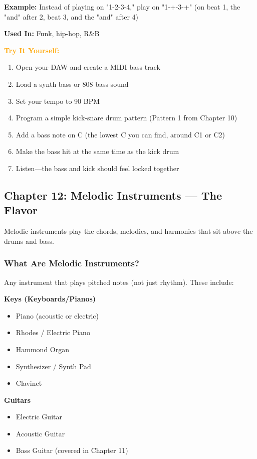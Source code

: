 \documentclass[11pt,letterpaper]{article}
\newcommand{\orangetext}[1]{\textcolor{orange}{\textbf{#1}}}
\begin{document}
\textbf{Example:} Instead of playing on "1-2-3-4," play on "1-+-3-+" (on beat 1, the "and" after 2, beat 3, and the "and" after 4)

\textbf{Used In:} Funk, hip-hop, R\&B

\textbf{\orangetext{Try It Yourself:}}

\begin{enumerate}[leftmargin=*]
\item Open your DAW and create a MIDI bass track
\item Load a synth bass or 808 bass sound
\item Set your tempo to 90 BPM
\item Program a simple kick-snare drum pattern (Pattern 1 from Chapter 10)
\item Add a bass note on C (the lowest C you can find, around C1 or C2)
\item Make the bass hit at the same time as the kick drum
\item Listen—the bass and kick should feel locked together
\end{enumerate}

\newpage

\subsection{Chapter 12: Melodic Instruments — The Flavor}

Melodic instruments play the chords, melodies, and harmonies that sit above the drums and bass.

\subsubsection{What Are Melodic Instruments?}

Any instrument that plays pitched notes (not just rhythm). These include:

\textbf{Keys (Keyboards/Pianos)}
\begin{itemize}[leftmargin=*]
\item Piano (acoustic or electric)
\item Rhodes / Electric Piano
\item Hammond Organ
\item Synthesizer / Synth Pad
\item Clavinet
\end{itemize}

\textbf{Guitars}
\begin{itemize}[leftmargin=*]
\item Electric Guitar
\item Acoustic Guitar
\item Bass Guitar (covered in Chapter 11)
\end{itemize}
\end{document}
